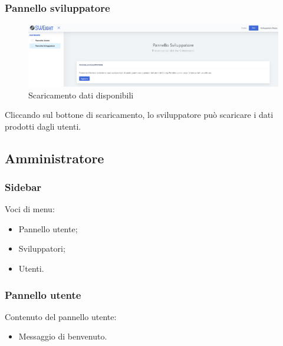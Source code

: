     	\subsubsection{Pannello sviluppatore}
    		\begin{figure}[H]
				\centering
				\includegraphics[width=17cm]{sez/img/sviluppatore/datipronti.PNG}
				\caption{Scaricamento dati disponibili}\label{fig:1}
			\end{figure}
		  Cliccando sul bottone di scaricamento, lo sviluppatore può scaricare i dati prodotti dagli utenti.




	\newpage
	\subsection{Amministratore}
		\subsubsection{Sidebar}
		  Voci di menu:
			\begin{itemize}
				\item Pannello utente;
				\item Sviluppatori;
				\item Utenti.
			\end{itemize}



		\subsubsection{Pannello utente}
		 Contenuto del pannello utente:
			\begin{itemize}
				\item Messaggio di benvenuto.
			\end{itemize}




